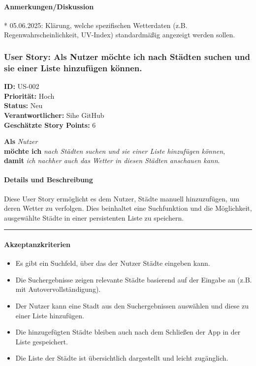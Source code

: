 \documentclass{article}
\begin{document}
\paragraph{Anmerkungen/Diskussion}
* 05.06.2025: Klärung, welche spezifischen Wetterdaten (z.B. Regenwahrscheinlichkeit, UV-Index) standardmäßig angezeigt werden sollen.

\clearpage

\subsubsection{User Story: Als Nutzer möchte ich nach Städten suchen und sie einer Liste hinzufügen können.}
\textcolor{storyblue}{\textbf{ID:}} US-002 \\
\textcolor{storyblue}{\textbf{Priorität:}} Hoch \\
\textcolor{storyblue}{\textbf{Status:}} Neu \\
\textcolor{storyblue}{\textbf{Verantwortlicher:}} Sihe GitHub \\
\textcolor{storyblue}{\textbf{Geschätzte Story Points:}} 6

\vspace{0.5em}

\textcolor{storygreen}{\textbf{Als}} \textit{Nutzer} \\
\textcolor{storygreen}{\textbf{möchte ich}} \textit{nach Städten suchen und sie einer Liste hinzufügen können}, \\
\textcolor{storygreen}{\textbf{damit}} \textit{ich nachher auch das Wetter in diesen Städten anschauen kann}.

\vspace{1em}

\paragraph{Details und Beschreibung}
Diese User Story ermöglicht es dem Nutzer, Städte manuell hinzuzufügen, um deren Wetter zu verfolgen. Dies beinhaltet eine Suchfunktion und die Möglichkeit, ausgewählte Städte in einer persistenten Liste zu speichern.

\vspace{0.5em}
\hrule

\paragraph{Akzeptanzkriterien}
\begin{itemize}
    \item Es gibt ein Suchfeld, über das der Nutzer Städte eingeben kann.
    \item Die Suchergebnisse zeigen relevante Städte basierend auf der Eingabe an (z.B. mit Autovervollständigung).
    \item Der Nutzer kann eine Stadt aus den Suchergebnissen auswählen und diese zu einer Liste hinzufügen.
    \item Die hinzugefügten Städte bleiben auch nach dem Schließen der App in der Liste gespeichert.
    \item Die Liste der Städte ist übersichtlich dargestellt und leicht zugänglich.
\end{itemize}
\end{document}
